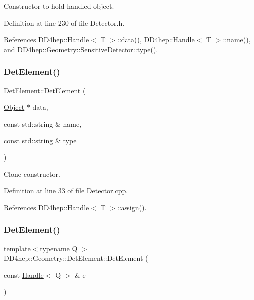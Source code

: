 Constructor to hold handled object. 



Definition at line 230 of file Detector.\+h.



References D\+D4hep\+::\+Handle$<$ T $>$\+::data(), D\+D4hep\+::\+Handle$<$ T $>$\+::name(), and D\+D4hep\+::\+Geometry\+::\+Sensitive\+Detector\+::type().

\hypertarget{class_d_d4hep_1_1_geometry_1_1_det_element_ace96f81c5174b66f986d8c8ccdcab827}{}\label{class_d_d4hep_1_1_geometry_1_1_det_element_ace96f81c5174b66f986d8c8ccdcab827} 
\subsubsection{\texorpdfstring{Det\+Element()}{DetElement()}\hspace{0.1cm}{\footnotesize\ttfamily [3/8]}}
{\footnotesize\ttfamily Det\+Element\+::\+Det\+Element (\begin{DoxyParamCaption}\item[{\hyperlink{class_d_d4hep_1_1_geometry_1_1_det_element_a4e44e860d6e5827d9f42a4aea3a4f288}{Object} $\ast$}]{data,  }\item[{const std\+::string \&}]{name,  }\item[{const std\+::string \&}]{type }\end{DoxyParamCaption})}



Clone constructor. 



Definition at line 33 of file Detector.\+cpp.



References D\+D4hep\+::\+Handle$<$ T $>$\+::assign().

\hypertarget{class_d_d4hep_1_1_geometry_1_1_det_element_af65fc704c01eced25bf5c79252697d82}{}\label{class_d_d4hep_1_1_geometry_1_1_det_element_af65fc704c01eced25bf5c79252697d82} 
\subsubsection{\texorpdfstring{Det\+Element()}{DetElement()}\hspace{0.1cm}{\footnotesize\ttfamily [4/8]}}
{\footnotesize\ttfamily template$<$typename Q $>$ \\
D\+D4hep\+::\+Geometry\+::\+Det\+Element\+::\+Det\+Element (\begin{DoxyParamCaption}\item[{const \hyperlink{class_d_d4hep_1_1_handle}{Handle}$<$ Q $>$ \&}]{e }\end{DoxyParamCaption})\hspace{0.3cm}{\ttfamily [inline]}}



